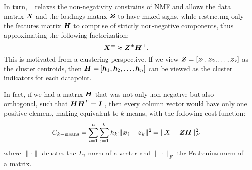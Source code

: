 \documentclass[10pt,journal,compsoc]{IEEEtran}
\begin{document}



In turn, \seminmf~\cite{ding2010convex}  relaxes the non-negativity constrains of NMF and allows the data matrix ${\boldsymbol X}$ and the loadings matrix ${\boldsymbol Z}$ to have mixed signs, while restricting only the features matrix ${\boldsymbol H}$ to comprise of strictly non-negative components, thus approximating the following factorization: 
\begin{equation}{\boldsymbol X}^{\pm} \approx {\boldsymbol Z^{\pm} \boldsymbol H^+}.
\label{eq:seminmf}
\end{equation}
This is motivated  from a clustering perspective. If we view ${{\boldsymbol{Z}} = [{\boldsymbol{z}_1}, {\boldsymbol{z}_2}, \ldots, {\boldsymbol{z}_k}]}$ as the cluster centroids, then ${{\boldsymbol{H}} = [{\boldsymbol{h}_1}, {\boldsymbol{h}_2}, \ldots, {\boldsymbol{h}_n}]}$ can be viewed as the cluster indicators for each datapoint. 

In fact, if we had a matrix ${\boldsymbol H}$ that was not only non-negative but also orthogonal, such that ${{\boldsymbol H \boldsymbol H^T}={\boldsymbol{I}}}$ \cite{ding2010convex}, then every column vector would have only one positive element, making \seminmf equivalent to $k$-means, with the following cost function:
\begin{equation}
C_{k-\text{means}} = \sum_{i=1}^n \sum_{j=1}^k h_{ki} \|{\boldsymbol{x}_i} - {\boldsymbol{z}_k}\|^2 = \| {\boldsymbol{X}} - {\boldsymbol Z \boldsymbol H} \|^2_F
\end{equation}
where $\|\cdot\|$ denotes the $L_2$-norm of a vector and $\|\cdot\|_F$ the Frobenius norm of a matrix.
\end{document}
